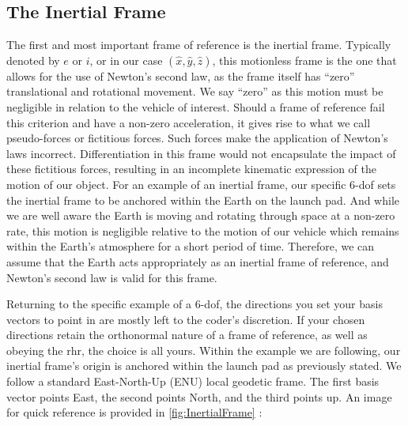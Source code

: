 \documentclass[10pt, openany, titlepage]{book}
\theoremstyle{definition}
\newcounter{example}[chapter]
\let\oldautoref\autoref
\renewcommand{\autoref}[1]{%
  \begingroup
  \hypersetup{linkcolor=black}%
  \oldautoref{#1}%
  \endgroup
}
\begin{document}
\subsection{The Inertial Frame}

The first and most important frame of reference is the \gls{inertial frame}. Typically denoted by $e$ or $i$, or in our case $(\hat{x},\hat{y},\hat{z})$, this motionless frame is the one that allows for the use of Newton’s second law, as the frame itself has ``zero'' translational and rotational movement. We say “zero” as this motion must be negligible in relation to the vehicle of interest. Should a frame of reference fail this criterion and have a non-zero acceleration, it gives rise to what we call pseudo-forces or fictitious forces. Such forces make the application of Newton's laws incorrect. Differentiation in this frame would not encapsulate the impact of these fictitious forces, resulting in an incomplete kinematic expression of the motion of our object. For an example of an inertial frame, our specific 6-\gls{dof} sets the \gls{inertial frame} to be anchored within the Earth on the launch pad. And while we are well aware the Earth is moving and rotating through space at a non-zero rate, this motion is negligible relative to the motion of our vehicle which remains within the Earth's atmosphere for a short period of time. Therefore, we can assume that the Earth acts appropriately as an \gls{inertial frame} of reference, and Newton’s second law is valid for this frame. 

Returning to the specific example of a 6-\gls{dof}, the directions you set your basis vectors to point in are mostly left to the coder’s discretion. If your chosen directions retain the \gls{orthonormal} nature of a frame of reference, as well as obeying the \gls{rhr}, the choice is all yours. Within the example we are following, our \gls{inertial frame}’s origin is anchored within the launch pad as previously stated. We follow a standard East-North-Up (ENU) local geodetic frame. The first basis vector points East, the second points North, and the third points up. An image for quick reference is provided in \autoref{fig:InertialFrame}:
\end{document}
